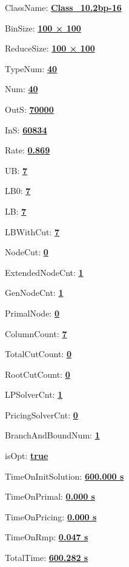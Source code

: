 \documentclass[11pt]{article}
\begin{document}
\pagestyle{empty}


ClassName: \underline{\textbf{Class_10.2bp-16}}
\par
BinSize: \underline{\textbf{100 × 100}}
\par
ReduceSize: \underline{\textbf{100 × 100}}
\par
TypeNum: \underline{\textbf{40}}
\par
Num: \underline{\textbf{40}}
\par
OutS: \underline{\textbf{70000}}
\par
InS: \underline{\textbf{60834}}
\par
Rate: \underline{\textbf{0.869}}
\par
UB: \underline{\textbf{7}}
\par
LB0: \underline{\textbf{7}}
\par
LB: \underline{\textbf{7}}
\par
LBWithCut: \underline{\textbf{7}}
\par
NodeCut: \underline{\textbf{0}}
\par
ExtendedNodeCnt: \underline{\textbf{1}}
\par
GenNodeCnt: \underline{\textbf{1}}
\par
PrimalNode: \underline{\textbf{0}}
\par
ColumnCount: \underline{\textbf{7}}
\par
TotalCutCount: \underline{\textbf{0}}
\par
RootCutCount: \underline{\textbf{0}}
\par
LPSolverCnt: \underline{\textbf{1}}
\par
PricingSolverCnt: \underline{\textbf{0}}
\par
BranchAndBoundNum: \underline{\textbf{1}}
\par
isOpt: \underline{\textbf{true}}
\par
TimeOnInitSolution: \underline{\textbf{600.000 s}}
\par
TimeOnPrimal: \underline{\textbf{0.000 s}}
\par
TimeOnPricing: \underline{\textbf{0.000 s}}
\par
TimeOnRmp: \underline{\textbf{0.047 s}}
\par
TotalTime: \underline{\textbf{600.282 s}}
\par
\newpage


\end{document}
